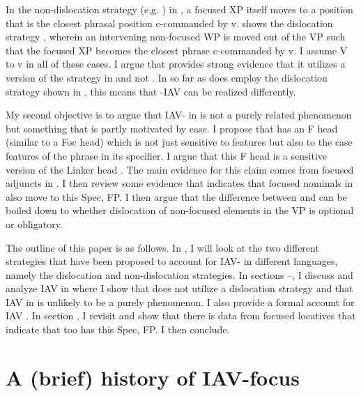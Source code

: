 \documentclass[output=paper
,newtxmath
,modfonts
,nonflat]{langsci/langscibook}
\begin{document}
In the non-dislocation strategy (e,g. \citealt{vanderwal2006}) in , a focused XP itself moves to a position that is the closest phrasal position c-commanded by v.  shows the dislocation strategy \citep{ChengDowning2009}, wherein an intervening non-focused WP is moved out of the VP such that the focused XP becomes the closest phrase c-commanded by v. I assume V to v  in all of these cases. I argue that  provides strong evidence that it utilizes a version of the strategy in  and not . In so far as  does employ the dislocation strategy shown in , this means that -IAV  can be realized differently. 

My second objective is to argue that IAV- in  is not a purely  related phenomenon but something that is partly motivated by case. I propose that  has an F head (similar to a Foc head) which is not just sensitive to  features but also to the case features of the phrase in its specifier. I argue that this F head is a  sensitive version of the Linker head \citep{Baker2006}. The main evidence for this claim comes from focused adjuncts in . I then review some evidence that indicates that focused nominals in  also move to this Spec, FP. I then argue that the difference between  and  can be boiled down to whether dislocation of non-focused elements in the VP is optional or obligatory.

The outline of this paper is as follows. In , I will look at the two different strategies that have been proposed to account for IAV- in different  languages, namely the dislocation and non-dislocation strategies. In sections –, I discuss and analyze IAV  in  where I show that  does not utilize a dislocation strategy and that IAV  in  is unlikely to be a purely  phenomenon. I also provide a formal account for  IAV . In section , I revisit  and show that there is data from focused locatives that indicate that  too has this Spec, FP. I then conclude.

\section{A (brief) history of IAV-focus}\label{sec:selvanathan:2}
\end{document}
